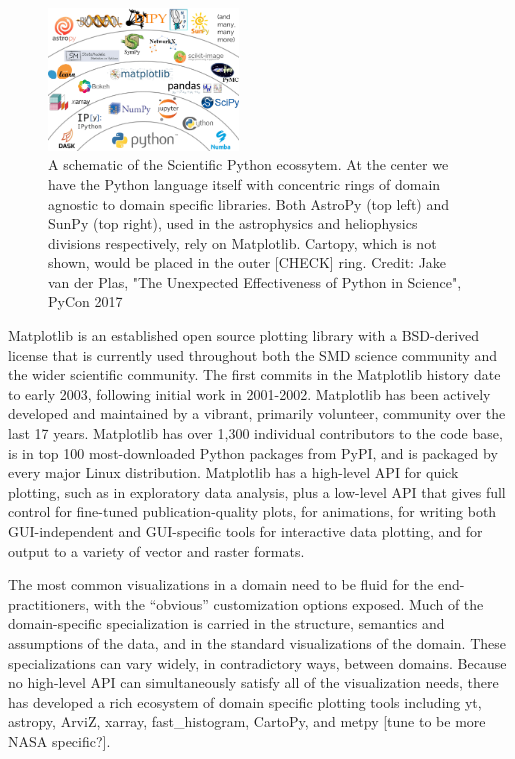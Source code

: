 \documentclass[12pt]{article}
\numberwithin{page}{section}
\begin{document}
\begin{figure}
  \includegraphics[width=0.45\textwidth]{scipy-ecosystem}
  \caption{A schematic of the Scientific Python ecossytem.  At the
    center we have the Python language itself with concentric rings of
    domain agnostic to domain specific libraries.  Both AstroPy (top
    left) and SunPy (top right), used in the astrophysics and
    heliophysics divisions respectively, rely on Matplotlib. Cartopy,
    which is not shown, would be placed in the outer [CHECK] ring.
    Credit: Jake van der Plas, "The Unexpected Effectiveness of Python
    in Science", PyCon 2017}
  \label{fig:ecosystem}
\end{figure}



Matplotlib \cite{Hunter:2007} is an established open source plotting
library with a BSD-derived license that is currently used throughout
both the SMD science community and the wider scientific community.
The first commits in the Matplotlib history date to early 2003, following
initial work in 2001-2002. Matplotlib has been actively
developed and maintained by a vibrant, primarily volunteer, community
over the last 17 years.  Matplotlib has over 1,300 individual
contributors to the code base, is in top 100 most-downloaded Python
packages from PyPI, and is packaged by every major Linux distribution.
Matplotlib has a high-level API for quick plotting, such as in
exploratory data analysis, plus a low-level API that gives full control for
fine-tuned publication-quality plots, for animations, for writing both
GUI-independent and GUI-specific tools for interactive data plotting, and
for output to a variety of vector and raster
formats.

The most common visualizations in a domain need to be fluid for the
end-practitioners, with the ``obvious'' customization options
exposed. Much of the domain-specific specialization is carried in the
structure, semantics and assumptions of the data, and in the standard
visualizations of the domain. These specializations can vary widely,
in contradictory ways, between domains. Because no high-level API can
simultaneously satisfy all of the visualization needs, there has
developed a rich ecosystem of domain specific plotting tools
including yt, astropy, ArviZ, xarray,
fast\_histogram, CartoPy, and metpy [tune to be more NASA specific?].
\end{document}
